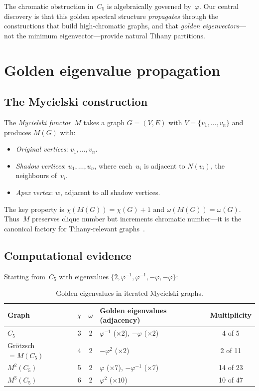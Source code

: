 \documentclass[11pt,a4paper]{amsart}
\theoremstyle{plain}
\theoremstyle{definition}
\theoremstyle{remark}
\newcommand{\vp}{\varphi}
\newcommand{\chr}{\chi}
\newcommand{\om}{\omega}
\begin{document}
The chromatic obstruction in~$C_5$ is algebraically governed by~$\vp$.  Our
central discovery is that this golden spectral structure \emph{propagates}
through the constructions that build high-chromatic graphs, and that
\emph{golden eigenvectors}---not the minimum eigenvector---provide natural
Tihany partitions.

\section{Golden eigenvalue propagation}\label{sec:propagation}

\subsection{The Mycielski construction}

The \emph{Mycielski functor}~$M$ takes a graph $G = (V,E)$ with
$V = \{v_1,\ldots,v_n\}$ and produces $M(G)$ with:
\begin{itemize}
\item \emph{Original vertices}: $v_1,\ldots,v_n$.
\item \emph{Shadow vertices}: $u_1,\ldots,u_n$, where each~$u_i$ is adjacent
  to $N(v_i)$, the neighbours of~$v_i$.
\item \emph{Apex vertex}: $w$, adjacent to all shadow vertices.
\end{itemize}
The key property is $\chr(M(G)) = \chr(G) + 1$ and $\om(M(G)) = \om(G)$.
Thus~$M$ preserves clique number but increments chromatic number---it is the
canonical factory for Tihany-relevant graphs~\cite{mycielski1955}.

\subsection{Computational evidence}

Starting from~$C_5$ with eigenvalues
$\{2,\vp^{-1},\vp^{-1},-\vp,-\vp\}$:

\begin{table}[ht]
\centering
\caption{Golden eigenvalues in iterated Mycielski graphs.}
\label{tab:golden-eigs}
\begin{tabular}{lcclc}
\toprule
Graph & $\chr$ & $\om$ & Golden eigenvalues (adjacency) & Multiplicity \\
\midrule
$C_5$             & 3 & 2 & $\vp^{-1}$ ($\times 2$), $-\vp$ ($\times 2$) & 4 of 5 \\
Gr\"otzsch $= M(C_5)$ & 4 & 2 & $-\vp^2$ ($\times 2$) & 2 of 11 \\
$M^2(C_5)$        & 5 & 2 & $\vp$ ($\times 7$), $-\vp^{-1}$ ($\times 7$) & 14 of 23 \\
$M^3(C_5)$        & 6 & 2 & $\vp^2$ ($\times 10$) & 10 of 47 \\
\bottomrule
\end{tabular}
\end{table}
\end{document}
